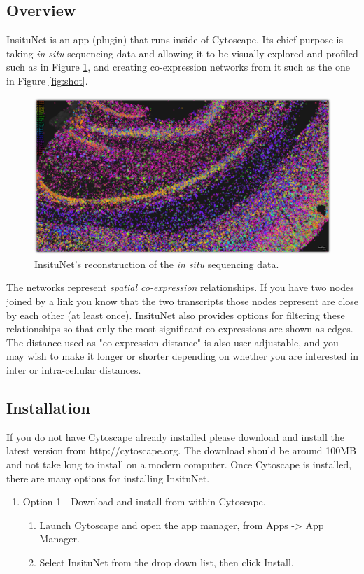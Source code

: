 \documentclass[a4paper,12pt]{article}
\begin{document}
\subsection{Overview}
InsituNet is an app (plugin) that runs inside of Cytoscape. Its chief purpose is taking \emph{in situ} sequencing data and allowing it to be visually explored and profiled such as in Figure \ref{fig:recon}, and creating co-expression networks from it such as the one in Figure \ref{fig:shot}.
\begin{figure}[h]
	\caption{InsituNet's reconstruction of the \emph{in situ} sequencing data.}\label{fig:recon}
	\centering
	\includegraphics[width=\textwidth]{reconstruction-shadow}
\end{figure}

The networks represent \emph{spatial co-expression} relationships. If you have two nodes joined by a link you know that the two transcripts those nodes represent are close by each other (at least once). InsituNet also provides options for filtering these relationships so that only the most significant co-expressions are shown as edges. The distance used as "co-expression distance" is also user-adjustable, and you may wish to make it longer or shorter depending on whether you are interested in inter or intra-cellular distances.

\subsection{Installation}
If you do not have Cytoscape already installed please download and install the latest version from http://cytoscape.org. The download should be around 100MB and not take long to install on a modern computer. Once Cytoscape is installed, there are many options for installing InsituNet.
\begin{enumerate}
	\item Option 1 - Download and install from within Cytoscape.
		\begin{enumerate}
			\item Launch Cytoscape and open the app manager, from Apps -> App Manager.
			\item Select InsituNet from the drop down list, then click Install.
		\end{enumerate}
\end{enumerate}
\end{document}
